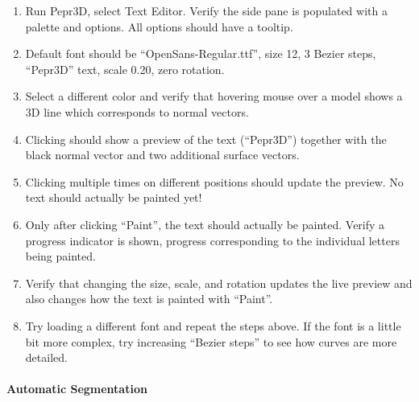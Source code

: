 \begin{enumerate}
\item Run Pepr3D, select Text Editor. Verify the side pane is populated with a palette and options. All options should have a tooltip.
\item Default font should be ``OpenSans-Regular.ttf'', size 12, 3 Bezier steps, ``Pepr3D'' text, scale 0.20, zero rotation.
\item Select a different color and verify that hovering mouse over a model shows a 3D line which corresponds to normal vectors.
\item Clicking should show a preview of the text (``Pepr3D'') together with the black normal vector and two additional surface vectors.
\item Clicking multiple times on different positions should update the preview. No text should actually be painted yet!
\item Only after clicking ``Paint'', the text should actually be painted. Verify a progress indicator is shown, progress corresponding to the individual letters being painted.
\item Verify that changing the size, scale, and rotation updates the live preview and also changes how the text is painted with ``Paint''.
\item Try loading a different font and repeat the steps above. If the font is a little bit more complex, try increasing ``Bezier steps'' to see how curves are more detailed.
\end{enumerate}

\paragraph{Automatic Segmentation}

